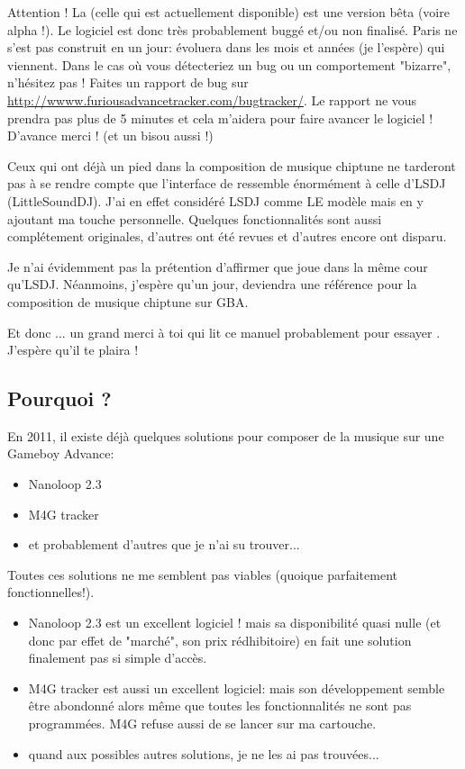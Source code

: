 \documentclass[12pt,a4paper]{article}
\begin{document}
    Attention ! La \fatversion (celle qui est actuellement disponible) est une version bêta (voire alpha !). Le logiciel est donc très probablement buggé et/ou non finalisé. Paris ne s'est pas construit en un jour: \FAT évoluera dans les mois et années (je l'espère) qui viennent. Dans le cas où vous détecteriez un bug ou un comportement "bizarre", n'hésitez pas ! Faites un rapport de bug sur \url{http://wwww.furiousadvancetracker.com/bugtracker/}. Le rapport ne vous prendra pas plus de 5 minutes et cela m'aidera pour faire avancer le logiciel ! D'avance merci ! (et un bisou aussi !)\medskip
    
    Ceux qui ont déjà un pied dans la composition de musique chiptune ne tarderont pas à se rendre compte que l'interface de \FAT ressemble énormément à celle d'LSDJ (LittleSoundDJ). J'ai en effet considéré LSDJ comme LE modèle mais en y ajoutant ma touche personnelle. Quelques fonctionnalités sont aussi complétement originales, d'autres ont été revues et d'autres encore ont disparu.\medskip
    
    Je n'ai évidemment pas la prétention d'affirmer que \FAT joue dans la même cour qu'LSDJ. Néanmoins, j'espère qu'un jour, \FAT deviendra une référence pour la composition de musique chiptune sur GBA.\medskip
    
    Et donc ... un grand merci à toi qui lit ce manuel probablement pour essayer \FAT. J'espère qu'il te plaira !
  
    \subsection{Pourquoi \FAT ?}
    En 2011, il existe déjà quelques solutions pour composer de la musique sur une Gameboy Advance:\medskip
    
    \begin{itemize}
        \item{Nanoloop 2.3}
        \item{M4G tracker}
        \item{et probablement d'autres que je n'ai su trouver...}
    \end{itemize}\medskip
    
    Toutes ces solutions ne me semblent pas viables (quoique parfaitement fonctionnelles!).\medskip
    
    \begin{itemize}
        \item{Nanoloop 2.3 est un excellent logiciel ! mais sa disponibilité quasi nulle (et donc par effet de "marché", son prix rédhibitoire) en fait une solution finalement pas si simple d'accès.}
        \item{M4G tracker est aussi un excellent logiciel: mais son développement semble être abondonné alors même que toutes les fonctionnalités ne sont pas programmées. M4G refuse aussi de se lancer sur ma cartouche.}
        \item{quand aux possibles autres solutions, je ne les ai pas trouvées...}
    \end{itemize}\medskip
    
\end{document}
